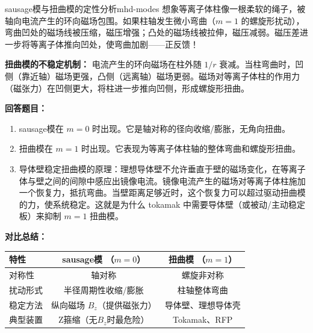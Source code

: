 \begin{example}{sausage模与扭曲模的定性分析}{mhd-modes}
想象等离子体柱像一根柔软的绳子，被轴向电流产生的环向磁场包围。如果柱轴发生微小弯曲（$m=1$ 的螺旋形扰动），弯曲凹处的磁场线被压缩，磁压增强；凸处的磁场线被拉伸，磁压减弱。磁压差进一步将等离子体推向凹处，使弯曲加剧——正反馈！

\textbf{扭曲模的不稳定机制：}
电流产生的环向磁场在柱外随 $1/r$ 衰减。当柱弯曲时，凹侧（靠近轴）磁场更强，凸侧（远离轴）磁场更弱。磁场对等离子体柱的作用力（磁张力）在凹侧更大，将柱进一步推向凹侧，形成螺旋形扭曲。

\textbf{回答题目：}
\begin{enumerate}[label=(\arabic*)]
\item sausage模在 $m=0$ 时出现。它是轴对称的径向收缩/膨胀，无角向扭曲。
\item 扭曲模在 $m=1$ 时出现。它表现为等离子体柱轴的整体弯曲和螺旋形扭曲。
\item 导体壁稳定扭曲模的原理：理想导体壁不允许垂直于壁的磁场变化，在等离子体与壁之间的间隙中感应出镜像电流。镜像电流产生的磁场对等离子体柱施加一个恢复力，抵抗弯曲。当壁距离足够近时，这个恢复力可以超过驱动扭曲模的力，使系统稳定。这就是为什么 tokamak 中需要导体壁（或被动/主动稳定板）来抑制 $m=1$ 扭曲模。
\end{enumerate}

\textbf{对比总结：}
\begin{center}
\begin{tabular}{lcc}
\toprule
\textbf{特性} & \textbf{sausage模} （$m=0$） & \textbf{扭曲模} （$m=1$） \\
\midrule
对称性 & 轴对称 & 螺旋非对称 \\
扰动形式 & 半径周期性收缩/膨胀 & 柱轴整体弯曲 \\
稳定方法 & 纵向磁场 $B_z$（提供磁张力） & 导体壁、理想导体壳 \\
典型装置 & Z箍缩（无$B_z$时最危险） & Tokamak、RFP \\
\bottomrule
\end{tabular}
\end{center}
\end{example}

